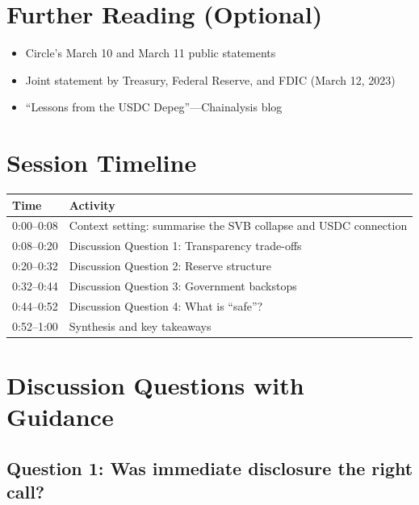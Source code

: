 \documentclass[11pt]{article}
\begin{document}
\section*{Further Reading (Optional)}

\begin{itemize}[leftmargin=*]
\item Circle's March 10 and March 11 public statements
\item Joint statement by Treasury, Federal Reserve, and FDIC (March 12, 2023)
\item ``Lessons from the USDC Depeg''---Chainalysis blog
\end{itemize}

\newpage


\section*{Session Timeline}

\begin{center}
\begin{tabular}{ll}
\toprule
\textbf{Time} & \textbf{Activity} \\
\midrule
0:00--0:08 & Context setting: summarise the SVB collapse and USDC connection \\
0:08--0:20 & Discussion Question 1: Transparency trade-offs \\
0:20--0:32 & Discussion Question 2: Reserve structure \\
0:32--0:44 & Discussion Question 3: Government backstops \\
0:44--0:52 & Discussion Question 4: What is ``safe''? \\
0:52--1:00 & Synthesis and key takeaways \\
\bottomrule
\end{tabular}
\end{center}

\section*{Discussion Questions with Guidance}

\subsection*{Question 1: Was immediate disclosure the right call?}
\end{document}
